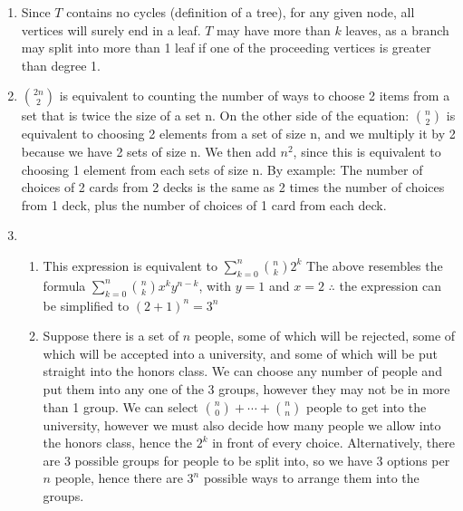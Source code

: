\documentclass{article}
\begin{document}
\begin{enumerate}
		\item Since $T$ contains no cycles (definition of a tree), for any given node, all vertices will surely end in a leaf. $T$ may have more than $k$ leaves, as a branch may split into more than 1 leaf if one of the proceeding vertices is greater than degree 1.
	
		\item ${{2n}\choose{2}}$ is equivalent to counting the number of ways to choose 2 items from a set that is twice the size of a set n.
		\newline On the other side of the equation:
		\newline ${{n}\choose{2}}$ is equivalent to choosing 2 elements from a set of size n, and we multiply it by 2 because we have 2 sets of size n.
		\newline We then add $n^2$, since this is equivalent to choosing 1 element from each sets of size n.
		\newline
		\newline By example:
		\newline The number of choices of 2 cards from 2 decks is the same as 2 times the number of choices from 1 deck, plus the number of choices of 1 card from each deck.
		
		\item
		\begin{enumerate}
			\item This expression is equivalent to $\sum\limits_{k=0}^n{{n}\choose{k}}2^k$
			\newline The above resembles the formula $\sum\limits_{k=0}^n{{n}\choose{k}}x^ky^{n-k}$, with $y=1$ and $x=2$
			\newline $\therefore$ the expression can be simplified to $(2+1)^n=3^n$
			
			\newpage
			\item Suppose there is a set of $n$ people, some of which will be rejected, some of which will be accepted into a university, and some of which will be put straight into the honors class. We can choose any number of people and put them into any one of the 3 groups, however they may not be in more than 1 group.
			\newline We can select ${n\choose0}+\cdots+{n\choose n}$ people to get into the university, however we must also decide how many people we allow into the honors class, hence the $2^k$ in front of every choice.
			\newline Alternatively, there are 3 possible groups for people to be split into, so we have 3 options per $n$ people, hence there are $3^n$ possible ways to arrange them into the groups.
		\end{enumerate}
	
	\end{enumerate}
\end{document}

